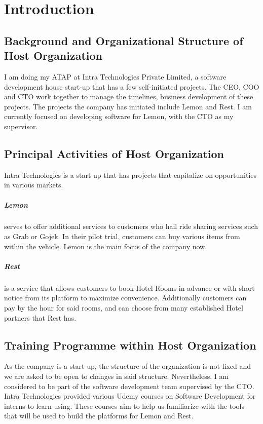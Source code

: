 \section{Introduction}
\subsection{Background and Organizational Structure of Host Organization}
\noindent
I am doing my ATAP at Intra Technologies Private Limited, a software development house start-up that has a few self-initiated projects.
The CEO, COO and CTO work together to manage the timelines, business development of these projects.
The projects the company has initiated include Lemon and Rest. I am currently focused on developing software for Lemon, with the CTO as my supervisor. 

\subsection{Principal Activities of Host Organization}
\noindent
Intra Technologies is a start up that has projects that capitalize on opportunities in various markets.

\subparagraph{Lemon}
serves to offer additional services to customers who hail ride sharing services such as Grab or Gojek. In their
pilot trial, customers can buy various items from within the vehicle. Lemon is the main focus of the company now.

\subparagraph{Rest}
is a service that allows customers to book Hotel Rooms in advance or with short notice from its platform to 
maximize convenience. Additionally customers can pay by the hour for said rooms, and can choose from 
many established Hotel partners that Rest has.

\subsection{Training Programme within Host Organization}
\noindent
As the company is a start-up, the structure of the organization is not fixed and we are asked to be open to changes in said structure. 
Nevertheless, I am considered to be part of the software development team supervised by the CTO.
Intra Technologies provided various Udemy courses on Software Development for interns to learn using.\cite{REF1:1}
These courses aim to help us familiarize with
the tools that will be used to build the platforms for Lemon and Rest.
